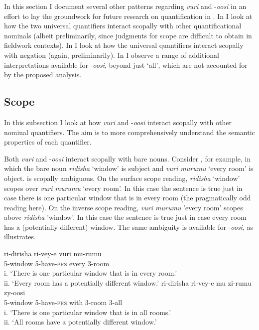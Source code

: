 \documentclass[output=paper]{langsci/langscibook}
\begin{document}
In this section I document several other patterns regarding \textit{vuri} and -\textit{oosi} in an effort to lay the groundwork for future research on quantification in . In  I look at how the two universal quantifiers interact scopally with other quantificational nominals (albeit preliminarily, since judgments for scope are difficult to obtain in fieldwork contexts). In  I look at how the universal quantifiers interact scopally with negation (again, preliminarily). In  I observe a range of additional interpretations available for -\textit{oosi}, beyond just ‘all’, which are not accounted for by the proposed analysis.

\subsection{Scope}\label{sec:landman:4.1} 

In this subsection I look at how \textit{vuri} and -\textit{oosi} interact scopally with other nominal quantifiers. The aim is to more comprehensively understand the semantic properties of each quantifier.

Both \textit{vuri} and -\textit{oosi} interact scopally with bare nouns. Consider , for example, in which the bare noun \textit{ridisha} ‘window’ is subject and \textit{vuri murumu} ‘every room’ is object.  is scopally ambiguous. On the surface scope reading, \textit{ridisha} ‘window’ scopes over \textit{vuri murumu} ‘every room’. In this case the sentence is true just in case there is one particular window that is in every room (the pragmatically odd reading here). On the inverse scope reading, \textit{vuri murumu} 'every room' scopes above \textit{ridisha} 'window'. In this case the sentence is true just in case every room has a (potentially different) window. The same ambiguity is available for -\textit{oosi}, as  illustrates.

\ea\label{ex:landman:26} 
\ea\label{ex:landman:26a}
\gll ri-dirisha  ri-vey-e  vuri  mu-rumu  \\
     5-window  5-have-\textsc{prs}  every  3-room\\
\glt i. ‘There is one particular window that is in every room.’  \\
ii. ‘Every room has a potentially different window.’  
\ex\label{ex:landman:26b}
\gll ri-dirisha  ri-vey-e  mu  zi-rumu  zy-oosi\\
     5-window  5-have-\textsc{prs}  with  3-room  3-all\\
\glt i. ‘There is one particular window that is in all rooms.’ \\
ii. ‘All rooms have a potentially different window.’        
\z
\z
\end{document}
